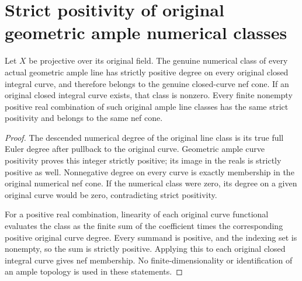 \section{Strict positivity of original geometric ample numerical classes}
\label{sec:native-numerical-ample-classes}

\begin{theorem}
\label{thm:native-numerical-ample-classes}
\leanok
{}
Let $X$ be projective over its original field. The genuine
numerical class of every actual geometric ample line has
strictly positive degree on every original closed integral
curve, and therefore belongs to the genuine closed-curve nef
cone. If an original closed integral curve exists, that class
is nonzero. Every finite nonempty positive real combination
of such original ample line classes has the same strict
positivity and belongs to the same nef cone.
\end{theorem}

\begin{proof}
The descended numerical degree of the original line class is
its true full Euler degree after pullback to the original
curve. Geometric ample curve positivity proves this integer
strictly positive; its image in the reals is strictly positive
as well. Nonnegative degree on every curve is exactly membership
in the original numerical nef cone. If the numerical class
were zero, its degree on a given original curve would be zero,
contradicting strict positivity.

For a positive real combination, linearity of each original
curve functional evaluates the class as the finite sum of
the coefficient times the corresponding positive original
curve degree. Every summand is positive, and the indexing
set is nonempty, so the sum is strictly positive. Applying
this to each original closed integral curve gives nef
membership. No finite-dimensionality or identification of
an ample topology is used in these statements.
\end{proof}
